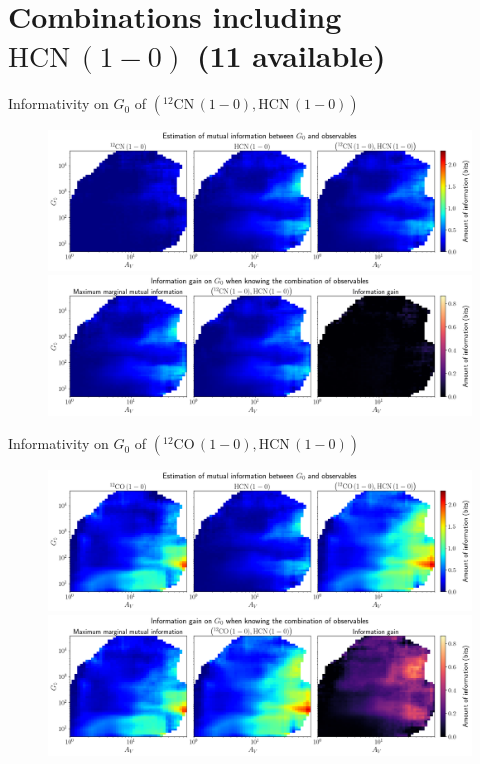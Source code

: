 \documentclass{beamer}
\begin{document}
\section{Combinations including $\mathrm{HCN\,(1-0)}$ (11 available)}

\begin{frame}{Informativity on $G_0$ of $\left(\mathrm{^{12}CN\,(1-0)},\mathrm{HCN\,(1-0)}\right)$}
    \begin{figure}
        \centering
        \includegraphics[width=0.95\linewidth]{../mi/g0__12cn10_hcn10_mi.png}
        \vfill
        \includegraphics[width=0.95\linewidth]{../mi/g0__12cn10_hcn10_mi_gain.png}
    \end{figure}
\end{frame}

\begin{frame}{Informativity on $G_0$ of $\left(\mathrm{^{12}CO\,(1-0)},\mathrm{HCN\,(1-0)}\right)$}
    \begin{figure}
        \centering
        \includegraphics[width=0.95\linewidth]{../mi/g0__12co10_hcn10_mi.png}
        \vfill
        \includegraphics[width=0.95\linewidth]{../mi/g0__12co10_hcn10_mi_gain.png}
    \end{figure}
\end{frame}
\end{document}

